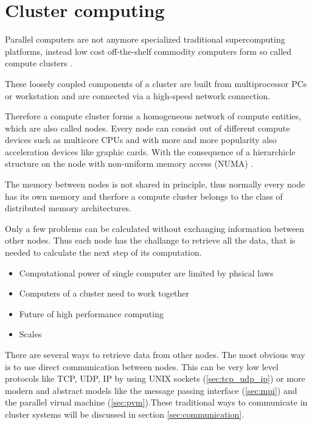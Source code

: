 \section{Cluster computing}
Parallel computers are not anymore specialized traditional
supercomputing platforms, instead low cost off-the-shelf commodity
computers form so called compute clusters \cite{ref:hpcc1}.

These loosely coupled components of a cluster are built from
multiprocessor PCs or workstation and are connected via a high-speed
network connection.

Therefore a compute cluster forms a homogeneous network of compute
entities, which are also called nodes. Every node can consist out of
different compute devices such as multicore CPUs and with more and
more popularity also acceleration devices like graphic cards. With the
consequence of a hierarchicle structure on the node with non-uniform
memory access (NUMA) \cite[numa]{ref:numa}.

The memory between nodes is not shared in principle, thus normally
every node has its own memory and therfore a compute cluster belongs
to the class of distributed memory architectures.

Only a few problems can be calculated without exchanging information
between other nodes. Thus each node has the challange to retrieve all
the data, that is needed to calculate the next step of its
computation.

\begin{itemize}
\item Computational power of single computer are limited by 
  phsical laws
\item Computers of a cluster need to work together
\item Future of high performance computing \cite{ref:hpc}
\item Scales
\end{itemize}

There are several ways to retrieve data from other nodes. The most
obvious way is to use direct communication between nodes. This can be
very low level protocols like TCP, UDP, IP by using UNIX sockets
(\ref{sec:tcp_udp_ip}) or more modern and abstract models like the
message passing interface (\ref{sec:mpi}) and the parallel virual
machine (\ref{sec:pvm}).These traditional ways to communicate in
cluster systems will be discussed in section \ref{sec:communication}.

